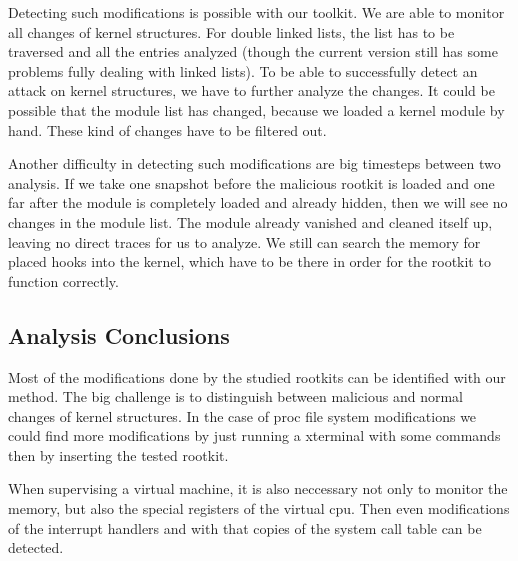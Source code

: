 Detecting such modifications is possible with our toolkit. We are able to monitor all changes of kernel structures. 
For double linked lists, the list has to be traversed and all the entries analyzed (though the current version 
still has some problems fully dealing with linked lists). To be able to successfully detect an attack on kernel 
structures, we have to further analyze the changes. It could be possible that the module list has changed, 
because we loaded a kernel module by hand. These kind of changes have to be filtered out. 

Another difficulty in detecting such modifications are big timesteps between two analysis. If we take one 
snapshot before the malicious rootkit is loaded and one far after the module is completely loaded and 
already hidden, then we will see no changes in the module list. The module already vanished and cleaned 
itself up, leaving no direct traces for us to analyze. We still can search the memory for placed hooks 
into the kernel, which have to be there in order for the rootkit to function correctly.

\subsection{Analysis Conclusions}
Most of the modifications done by the studied rootkits can be identified with our method. 
The big challenge is to distinguish between malicious and normal changes of kernel structures. 
In the case of proc file system modifications we could find 
more modifications by just running a xterminal with some commands then by inserting the tested rootkit.

When supervising a virtual machine, it is also neccessary not only to monitor the memory, but also the special registers 
of the virtual cpu. Then even modifications of the interrupt handlers and with that copies of the system call table can 
be detected.
